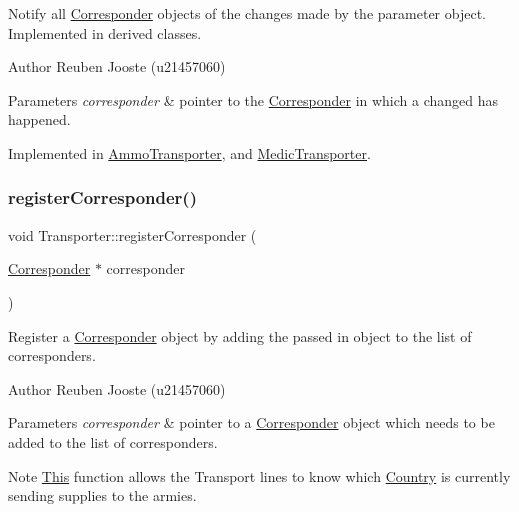 Notify all \mbox{\hyperlink{class_corresponder}{Corresponder}} objects of the changes made by the parameter object. Implemented in derived classes. 

\begin{DoxyAuthor}{Author}
Reuben Jooste (u21457060) 
\end{DoxyAuthor}

\begin{DoxyParams}{Parameters}
{\em corresponder} & pointer to the \mbox{\hyperlink{class_corresponder}{Corresponder}} in which a changed has happened. \\
\hline
\end{DoxyParams}


Implemented in \mbox{\hyperlink{class_ammo_transporter_a2f29d78a7be5b6116b7299494fef2b7e}{Ammo\+Transporter}}, and \mbox{\hyperlink{class_medic_transporter_ab77bbb1ad9e370c2045f1bbeb02f620b}{Medic\+Transporter}}.

\mbox{\label{class_transporter_ab9c0e1033746e012d0d784d2a293b079}} 
\subsubsection{\texorpdfstring{registerCorresponder()}{registerCorresponder()}}
{\footnotesize\ttfamily void Transporter\+::register\+Corresponder (\begin{DoxyParamCaption}\item[{\mbox{\hyperlink{class_corresponder}{Corresponder}} $\ast$}]{corresponder }\end{DoxyParamCaption})}



Register a \mbox{\hyperlink{class_corresponder}{Corresponder}} object by adding the passed in object to the list of corresponders. 

\begin{DoxyAuthor}{Author}
Reuben Jooste (u21457060) 
\end{DoxyAuthor}

\begin{DoxyParams}{Parameters}
{\em corresponder} & pointer to a \mbox{\hyperlink{class_corresponder}{Corresponder}} object which needs to be added to the list of corresponders. \\
\hline
\end{DoxyParams}
\begin{DoxyNote}{Note}
\mbox{\hyperlink{class_this}{This}} function allows the Transport lines to know which \mbox{\hyperlink{class_country}{Country}} is currently sending supplies to the armies. 
\end{DoxyNote}


